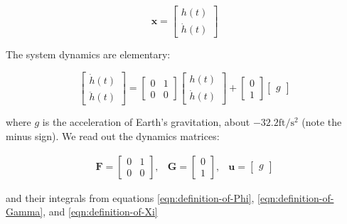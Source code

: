 \documentclass[10pt,oneside,x11names]{article}
\begin{document}
\begin{equation*}
\mathbold{x} = 
\begin{bmatrix} { h } (t) \\ \dot { h } (t) \end{bmatrix}
\end{equation*}

\noindent The system dynamics are elementary:

\begin{equation*}
\begin{bmatrix} \dot { h } (t) \\ \ddot { h } (t) \end{bmatrix}
=
\begin{bmatrix}
0 & 1 \\
0 & 0
\end{bmatrix}
\begin{bmatrix} h(t) \\ \dot { h } (t) \end{bmatrix}
+
\begin{bmatrix} 0 \\ 1 \end{bmatrix}
\begin{bmatrix} g \end{bmatrix}
\end{equation*}

\noindent where \(g\) is the acceleration of Earth's gravitation, about
\(-32.2\textrm{ft}/{\textrm{s}}^2\) (note the minus sign). We read out the
dynamics matrices:

\begin{equation*}
\begin{matrix}
\mathbold{F} = \begin{bmatrix}0 & 1 \\0 & 0\end{bmatrix}, &
\mathbold{G} = \begin{bmatrix} 0 \\ 1 \end{bmatrix}, &
\mathbold{u} = \begin{bmatrix} g \end{bmatrix}
\end{matrix}
\end{equation*}

\noindent and their integrals from equations \ref{eqn:definition-of-Phi},
\ref{eqn:definition-of-Gamma}, and \ref{eqn:definition-of-Xi}
\end{document}
